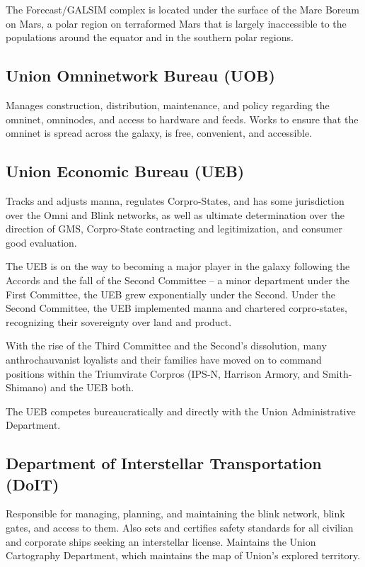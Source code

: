 The Forecast/GALSIM complex is located under the surface of the Mare Boreum on Mars, a
polar region on terraformed Mars that is largely inaccessible to the populations around the
equator and in the southern polar regions.

\subsection{Union Omninetwork Bureau (UOB)}

Manages construction, distribution, maintenance, and policy regarding the omninet, omninodes,
and access to hardware and feeds. Works to ensure that the omninet is spread across the
galaxy, is free, convenient, and accessible.

\subsection{Union Economic Bureau (UEB) }

Tracks and adjusts manna, regulates Corpro-States, and has some jurisdiction over the Omni
and Blink networks, as well as ultimate determination over the direction of GMS, Corpro-State
contracting and legitimization, and consumer good evaluation.

The UEB is on the way to becoming a major player in the galaxy following the Accords and the
fall of the Second Committee -- a minor department under the First Committee, the UEB grew
exponentially under the Second. Under the Second Committee, the UEB implemented manna
and chartered corpro-states, recognizing their sovereignty over land and product.

With the rise of the Third Committee and the Second's dissolution, many anthrochauvanist
loyalists and their families have moved on to command positions within the Triumvirate Corpros
(IPS-N, Harrison Armory, and Smith-Shimano) and the UEB both.

The UEB competes bureaucratically and directly with the Union Administrative Department.

\subsection{Department of Interstellar Transportation (DoIT)}

Responsible for managing, planning, and maintaining the blink network, blink gates, and access
to them. Also sets and certifies safety standards for all civilian and corporate ships seeking an
interstellar license. Maintains the Union Cartography Department, which maintains the map of
Union's explored territory.

